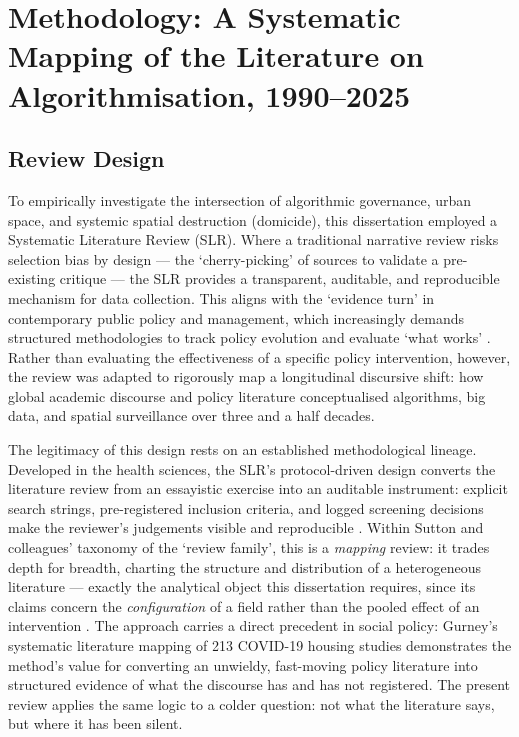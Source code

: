 
\chapter{Methodology: A Systematic Mapping of the Literature on Algorithmisation, 1990–2025}
\label{ch:methodology}

\section{Review Design}
\label{sec:review-design}

To empirically investigate the intersection of algorithmic governance, urban space, and systemic spatial destruction (domicide), this dissertation employed a Systematic Literature Review (SLR). Where a traditional narrative review risks selection bias by design — the `cherry-picking' of sources to validate a pre-existing critique — the SLR provides a transparent, auditable, and reproducible mechanism for data collection. This aligns with the `evidence turn' in contemporary public policy and management, which increasingly demands structured methodologies to track policy evolution and evaluate `what works' \parencite{tranfield2003}. Rather than evaluating the effectiveness of a specific policy intervention, however, the review was adapted to rigorously map a longitudinal discursive shift: how global academic discourse and policy literature conceptualised algorithms, big data, and spatial surveillance over three and a half decades.

The legitimacy of this design rests on an established methodological lineage. Developed in the health sciences, the SLR's protocol-driven design converts the literature review from an essayistic exercise into an auditable instrument: explicit search strings, pre-registered inclusion criteria, and logged screening decisions make the reviewer's judgements visible and reproducible \parencite{sutton2019}. Within Sutton and colleagues' taxonomy of the `review family', this is a \emph{mapping} review: it trades depth for breadth, charting the structure and distribution of a heterogeneous literature — exactly the analytical object this dissertation requires, since its claims concern the \emph{configuration} of a field rather than the pooled effect of an intervention \parencite{sutton2019}. The approach carries a direct precedent in social policy: Gurney's \citeyearpar[pp.~239--241]{gurney2023} systematic literature mapping of 213 COVID-19 housing studies demonstrates the method's value for converting an unwieldy, fast-moving policy literature into structured evidence of what the discourse has and has not registered. The present review applies the same logic to a colder question: not what the literature says, but where it has been silent.


